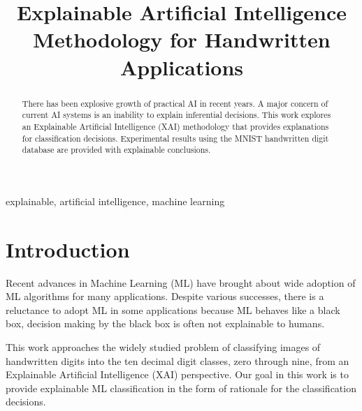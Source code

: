 \documentclass[conference]{IEEEtran}
\begin{document}
\title{Explainable Artificial Intelligence \\ {Methodology for Handwritten Applications}}

\author{

}

\maketitle

\begin{abstract}
There has been explosive growth of practical AI in recent years.
A major concern of current AI systems is an inability to explain inferential decisions.
This work explores an Explainable Artificial Intelligence (XAI) methodology that provides explanations
for classification decisions.  Experimental results using the MNIST handwritten digit database are provided with explainable conclusions.
\end{abstract}

\begin{IEEEkeywords}
explainable, artificial intelligence, machine learning
\end{IEEEkeywords}

\section{Introduction}

Recent advances in Machine Learning (ML) have brought about wide adoption of ML algorithms for many applications.  Despite various successes, there is a reluctance to adopt ML in some applications because ML behaves like a black box, decision making by the black box is often not explainable to humans.  

This work approaches the widely studied problem of classifying images of handwritten digits into the ten decimal digit classes, zero through nine, from an Explainable Artificial Intelligence (XAI) perspective.  Our goal in this work is to provide explainable ML classification in the form of rationale for the classification decisions.
\end{document}
